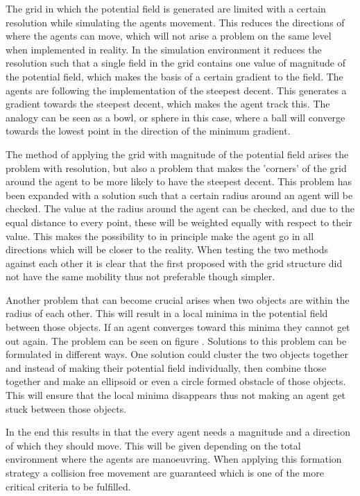 The grid in which the potential field is generated are limited with a certain resolution while simulating the agents movement. This reduces the directions of where the agents can move, which will not arise a problem on the same level when implemented in reality. In the simulation environment it reduces the resolution such that a single field in the grid contains one value of magnitude of the potential field, which makes the basis of a certain gradient to the field. The agents are following the implementation of the steepest decent. This generates a gradient towards the steepest decent, which makes the agent track this. The analogy can be seen as a bowl, or sphere in this case, where a ball will converge towards the lowest point in the direction of the minimum gradient.

The method of applying the grid with magnitude of the potential field arises the problem with resolution, but also a problem that makes the 'corners' of the grid around the agent to be more likely to have the steepest decent. This problem has been expanded with a solution such that a certain radius around an agent will be checked. The value at the radius around the agent can be checked, and due to the equal distance to every point, these will be weighted equally with respect to their value. This makes the possibility to in principle make the agent go in all directions which will be closer to the reality. When testing the two methods against each other it is clear that the first proposed with the grid structure did not have the same mobility thus not preferable though simpler.

Another problem that can become crucial arises when two objects are within the radius of each other. This will result in a local minima in the potential field between those objects. If an agent converges toward this minima they cannot get out again. The problem can be seen on figure . Solutions to this problem can be formulated in different ways. One solution could cluster the two objects together and instead of making their potential field individually, then combine those together and make an ellipsoid or even a circle formed obstacle of those objects. This will ensure that the local minima disappears thus not making an agent get stuck between those objects.

In the end this results in that the every agent needs a magnitude and a direction of which they should move. This will be given depending on the total environment where the agents are manoeuvring. When applying this formation strategy a collision free movement are guaranteed which is one of the more critical criteria to be fulfilled. 

